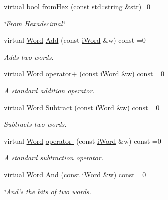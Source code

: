 \begin{DoxyCompactItemize}
virtual bool \hyperlink{classiWord_a986481dd43fb6256197109eb69c274fe}{fromHex} (const std::string \&str)=0
\begin{DoxyCompactList}\small\item\em \char`\"{}From Hexadecimal\char`\"{} \item\end{DoxyCompactList}\item 
virtual \hyperlink{classWord}{Word} \hyperlink{classiWord_ac5967eac5182607ac41b9ce6c3a74cb8}{Add} (const \hyperlink{classiWord}{iWord} \&w) const =0
\begin{DoxyCompactList}\small\item\em Adds two words. \item\end{DoxyCompactList}\item 
virtual \hyperlink{classWord}{Word} \hyperlink{classiWord_a146bf924df8cbb03fbe8152e5e44edbe}{operator+} (const \hyperlink{classiWord}{iWord} \&w) const =0
\begin{DoxyCompactList}\small\item\em A standard addition operator. \item\end{DoxyCompactList}\item 
virtual \hyperlink{classWord}{Word} \hyperlink{classiWord_a8e2da1fb4c3ffcc78e1d94f1798797ec}{Subtract} (const \hyperlink{classiWord}{iWord} \&w) const =0
\begin{DoxyCompactList}\small\item\em Subtracts two words. \item\end{DoxyCompactList}\item 
virtual \hyperlink{classWord}{Word} \hyperlink{classiWord_a8fbd3f879952196cca2e4f03bac3890b}{operator-\/} (const \hyperlink{classiWord}{iWord} \&w) const =0
\begin{DoxyCompactList}\small\item\em A standard subtraction operator. \item\end{DoxyCompactList}\item 
virtual \hyperlink{classWord}{Word} \hyperlink{classiWord_ad9caea73d7a990bf5189ba1e44ec7865}{And} (const \hyperlink{classiWord}{iWord} \&w) const =0
\begin{DoxyCompactList}\small\item\em \char`\"{}And\char`\"{}s the bits of two words. \item\end{DoxyCompactList}\item 

\end{DoxyCompactItemize}
